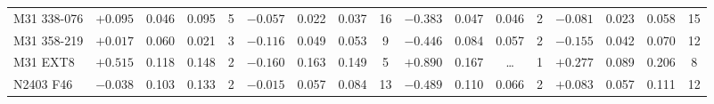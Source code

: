 \documentclass{aa}
\begin{document}
\begin{appendix}
\begin{table*}
\begin{adjustbox}{width=1\textwidth}
{\begin{tabular}{l cccccccccccccccc}
M31 338-076   & $+0.095$ & 0.046 & 0.095 & 5 & $-0.057$ & 0.022 & 0.037 & 16 & $-0.383$ & 0.047 & 0.046 & 2 & $-0.081$ & 0.023 & 0.058 & 15 \\
M31 358-219   & $+0.017$ & 0.060 & 0.021 & 3 & $-0.116$ & 0.049 & 0.053 & 9 & $-0.446$ & 0.084 & 0.057 & 2 & $-0.155$ & 0.042 & 0.070 & 12 \\
M31 EXT8      & $+0.515$ & 0.118 & 0.148 & 2 & $-0.160$ & 0.163 & 0.149 & 5 & $+0.890$ & 0.167 & \ldots & 1 & $+0.277$ & 0.089 & 0.206 & 8 \\
N2403 F46     & $-0.038$ & 0.103 & 0.133 & 2 & $-0.015$ & 0.057 & 0.084 & 13 & $-0.489$ & 0.110 & 0.066 & 2 & $+0.083$ & 0.057 & 0.111 & 12 \\
\hline
\end{tabular}
}
\end{adjustbox}
\end{table*}


\end{appendix}
\end{document}
